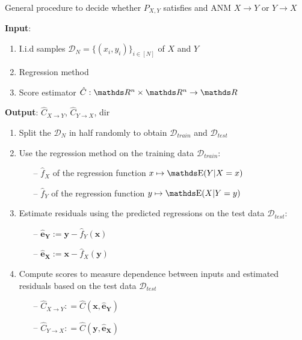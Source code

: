 \begin{algorithm}%

    \caption{General procedure to decide whether $P_{X, Y}$ satisfies and ANM $X \rightarrow Y$
        or $Y \rightarrow X$}
  
    \textbf{Input}:

    \begin{enumerate}
        \item I.i.d samples $\mathcal{D}_N = \{ (x_i, y_i )\}_{i \in [N]}$ of $X$ and $Y$
        \item Regression method
        \item Score estimator $\hat{C}: \R^n \times \R^n \rightarrow \R$
    \end{enumerate}
    
    \textbf{Output}: $\hat{C}_{X \rightarrow Y}$, $\hat{C}_{Y \rightarrow X}$, dir

    \begin{enumerate}

        \item Split the $\mathcal{D}_N$ in half randomly to obtain  $\mathcal{D}_{train}$ 
        and $\mathcal{D}_{test}$

        \item Use the regression method on the training data $\mathcal{D}_{train}$:
        \begin{itemize}
            \item[--] $\hat{f}_X$ of the regression function $x \mapsto \E(Y | X=x)$
            \item[--] $\hat{f}_Y$ of the regression function $y \mapsto \E(X | Y=y)$
        \end{itemize}

        \item Estimate residuals using the predicted regressions on the test data $\mathcal{D}_{test}$:
        \begin{itemize}
            \item[--] $ \mathbf{\hat{e}_Y} := \mathbf{y} - \hat{f}_Y(\mathbf{x})$
            \item[--] $ \mathbf{\hat{e}_X} := \mathbf{x} - \hat{f}_X(\mathbf{y})$
        \end{itemize}

        \item Compute scores to measure dependence between inputs and estimated residuals based on the
        test data $\mathcal{D}_{test}$
        \begin{itemize}
            \item[--] $\hat{C}_{X \rightarrow Y}: = \hat{C}(\mathbf{x}, \mathbf{\hat{e}_Y})$ 
            \item[--] $\hat{C}_{Y \rightarrow X}: = \hat{C}(\mathbf{y}, \mathbf{\hat{e}_X})$
        \end{itemize}        


\end{enumerate}
\end{algorithm}
